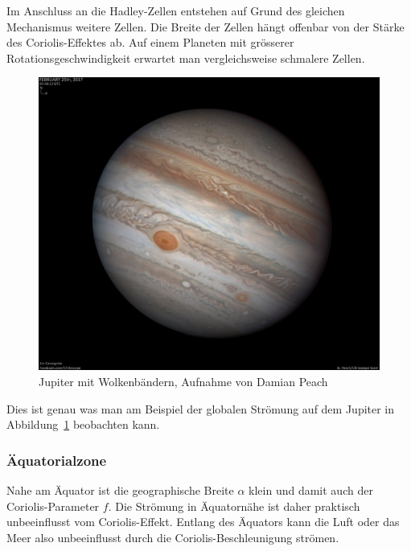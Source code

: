Im Anschluss an die Hadley-Zellen entstehen auf Grund des gleichen
Mechanismus weitere Zellen.
Die Breite der Zellen hängt offenbar von der Stärke des Coriolis-Effektes ab.
Auf einem Planeten mit grösserer Rotationsgeschwindigkeit erwartet man
vergleichsweise schmalere Zellen.
\begin{figure}
\centering
\includegraphics[width=\hsize]{chapters/1/Jupiter_on_25_February_2017_node_full_image_2.jpg}
\caption{Jupiter mit Wolkenbändern, Aufnahme von Damian Peach
\cite{skript:jupiter}
\label{skript:jupiterzirkulation}}
\end{figure}
Dies ist genau was man am Beispiel der globalen Strömung auf dem
Jupiter in Abbildung~\ref{skript:jupiterzirkulation} beobachten kann.

\subsubsection{Äquatorialzone}
Nahe am Äquator ist die geographische Breite $\alpha$ klein und
damit auch der Coriolis-Parameter $f$.
Die Strömung in Äquatornähe ist daher praktisch unbeeinflusst 
vom Coriolis-Effekt.
Entlang des Äquators kann die Luft oder das Meer also
unbeeinflusst durch die Coriolis-Beschleunigung strömen.

